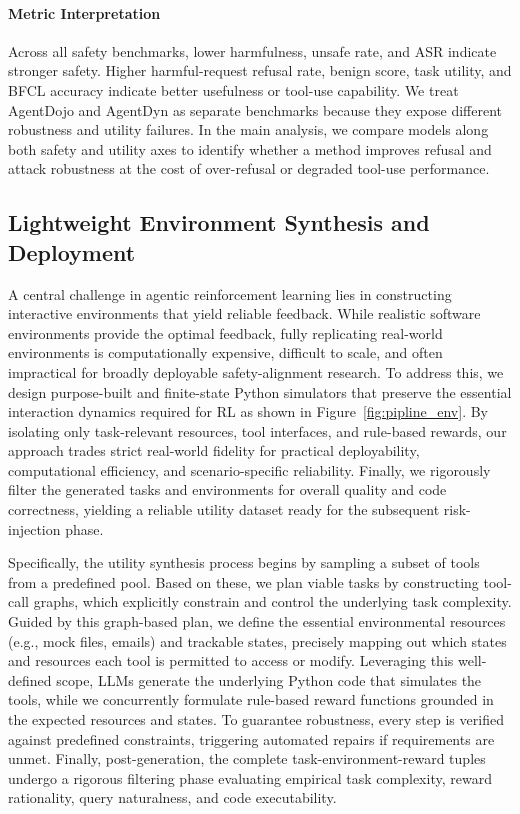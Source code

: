 \paragraph{Metric Interpretation}
Across all safety benchmarks, lower harmfulness, unsafe rate, and ASR indicate stronger safety. Higher harmful-request refusal rate, benign score, task utility, and BFCL accuracy indicate better usefulness or tool-use capability. We treat AgentDojo and AgentDyn as separate benchmarks because they expose different robustness and utility failures. In the main analysis, we compare models along both safety and utility axes to identify whether a method improves refusal and attack robustness at the cost of over-refusal or degraded tool-use performance.

\subsection{Lightweight Environment Synthesis and Deployment}
\label{app:env}
A central challenge in agentic reinforcement learning lies in constructing interactive environments that yield reliable feedback. While realistic software environments provide the optimal feedback, fully replicating real-world environments is computationally expensive, difficult to scale, and often impractical for broadly deployable safety-alignment research. To address this, we design purpose-built and finite-state Python simulators that preserve the essential interaction dynamics required for RL as shown in Figure~\ref{fig:pipline_env}. By isolating only task-relevant resources, tool interfaces, and rule-based rewards, our approach trades strict real-world fidelity for practical deployability, computational efficiency, and scenario-specific reliability. Finally, we rigorously filter the generated tasks and environments for overall quality and code correctness, yielding a reliable utility dataset ready for the subsequent risk-injection phase.

Specifically, the utility synthesis process begins by sampling a subset of tools from a predefined pool. Based on these, we plan viable tasks by constructing tool-call graphs, which explicitly constrain and control the underlying task complexity. Guided by this graph-based plan, we define the essential environmental resources (e.g., mock files, emails) and trackable states, precisely mapping out which states and resources each tool is permitted to access or modify. Leveraging this well-defined scope, LLMs generate the underlying Python code that simulates the tools, while we concurrently formulate rule-based reward functions grounded in the expected resources and states. To guarantee robustness, every step is verified against predefined constraints, triggering automated repairs if requirements are unmet. Finally, post-generation, the complete task-environment-reward tuples undergo a rigorous filtering phase evaluating empirical task complexity, reward rationality, query naturalness, and code executability.


